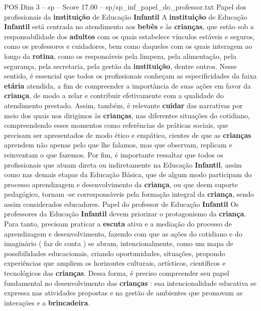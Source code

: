 \begin{textsample}{POS Dim 3 – sp – Score 17.00 – sp/sp\_inf\_papel\_do\_professor.txt}  \label{ex:f3_pos_204}
Papel dos profissionais da \textbf{instituição} de Educação \textbf{Infantil} A \textbf{instituição} de Educação \textbf{Infantil} está centrada no atendimento aos \textbf{bebês} e às \textbf{crianças}, que estão sob a responsabilidade dos \textbf{adultos} com os quais estabelece vínculos estáveis e seguros, como os professores e cuidadores, bem como daqueles com os quais interagem ao longo da \textbf{rotina}, como os responsáveis pela limpeza, pela alimentação, pela segurança, pela secretaria, pela gestão da \textbf{instituição}, dentre outros.
Nesse sentido, é essencial que todos os profissionais conheçam as especificidades da faixa \textbf{etária} atendida, a fim de compreender a importância de suas ações em favor da \textbf{criança}, de modo a zelar e contribuir efetivamente com a qualidade do atendimento prestado.
Assim, também, é relevante \textbf{cuidar} das narrativas por meio dos quais nos dirigimos às \textbf{crianças}, nas diferentes situações do cotidiano, compreendendo esses momentos como referências de práticas sociais, que precisam ser apresentados de modo ético e empático, cientes de que as \textbf{crianças} aprendem não apenas pelo que lhe falamos, mas que observam, replicam e reinventam o que fazemos.
Por fim, é importante ressaltar que todos os profissionais que atuam direta ou indiretamente na Educação \textbf{Infantil}, assim como nas demais etapas da Educação Básica, que de algum modo participam do processo aprendizagem e desenvolvimento da \textbf{criança}, ou que deem suporte pedagógico, tornam -se corresponsáveis pela formação integral da \textbf{criança}, sendo assim considerados educadores.
Papel do professor de Educação \textbf{Infantil} Os professores da Educação \textbf{Infantil} devem priorizar o protagonismo da \textbf{criança}.
Para tanto, precisam praticar a \textbf{escuta} ativa e a mediação do processo de aprendizagem e desenvolvimento, fazendo com que as ações do cotidiano e do imaginário ( faz de conta ) se abram, intencionalmente, como um mapa de possibilidades educacionais, criando oportunidades, situações, propondo experiências que ampliem os horizontes culturais, artísticos, científicos e tecnológicos das \textbf{crianças}.
Dessa forma, é preciso compreender seu papel fundamental no desenvolvimento das \textbf{crianças} : sua intencionalidade educativa se expressa nas atividades propostas e na gestão de ambientes que promovam as interações e a \textbf{brincadeira}.

\end{textsample}
